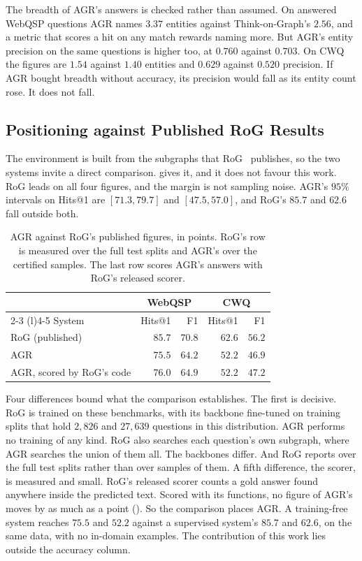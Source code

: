 The breadth of AGR's answers is checked rather than assumed. On answered WebQSP
questions AGR names $3.37$ entities against Think-on-Graph's $2.56$, and a
metric that scores a hit on any match rewards naming more. But AGR's entity
precision on the same questions is higher too, at $0.760$ against $0.703$. On
CWQ the figures are $1.54$ against $1.40$ entities and $0.629$ against $0.520$
precision. If AGR bought breadth without accuracy, its precision would fall as
its entity count rose. It does not fall.

\subsection{Positioning against Published RoG Results}\label{sec:rog}

The environment is built from the subgraphs that RoG~\cite{luo2024reasoning}
publishes, so the two systems invite a direct comparison.  gives
it, and it does not favour this work. RoG leads on all four figures, and the
margin is not sampling noise. AGR's $95\%$ intervals on Hits@1 are $[71.3,
79.7]$ and $[47.5, 57.0]$, and RoG's $85.7$ and $62.6$ fall outside both.

\begin{table}[!t]
\caption{AGR against RoG's published figures, in points. RoG's row is measured
  over the full test splits and AGR's over the certified samples. The last row
  scores AGR's answers with RoG's released scorer.}
\label{tab:rog}
\centering
\small
\begin{tabular}{@{}lrrrr@{}}
\toprule
& \multicolumn{2}{c}{WebQSP} & \multicolumn{2}{c}{CWQ} \\
\cmidrule(lr){2-3} \cmidrule(l){4-5}
System & Hits@1 & F1 & Hits@1 & F1 \\
\midrule
RoG (published) & $85.7$ & $70.8$ & $62.6$ & $56.2$ \\
AGR & $75.5$ & $64.2$ & $52.2$ & $46.9$ \\
AGR, scored by RoG's code & $76.0$ & $64.9$ & $52.2$ & $47.2$ \\
\bottomrule
\end{tabular}
\end{table}

Four differences bound what the comparison establishes. The first is decisive.
RoG is trained on these benchmarks, with its backbone fine-tuned on training
splits that hold $2{,}826$ and $27{,}639$ questions in this distribution. AGR
performs no training of any kind. RoG also searches each question's own
subgraph, where AGR searches the union of them all. The backbones differ. And
RoG reports over the full test splits rather than over samples of them. A fifth
difference, the scorer, is measured and small. RoG's released scorer counts a
gold answer found anywhere inside the predicted text. Scored with its functions,
no figure of AGR's moves by as much as a point (). So the
comparison places AGR. A training-free system reaches $75.5$ and $52.2$ against
a supervised system's $85.7$ and $62.6$, on the same data, with no in-domain
examples. The contribution of this work lies outside the accuracy column.

